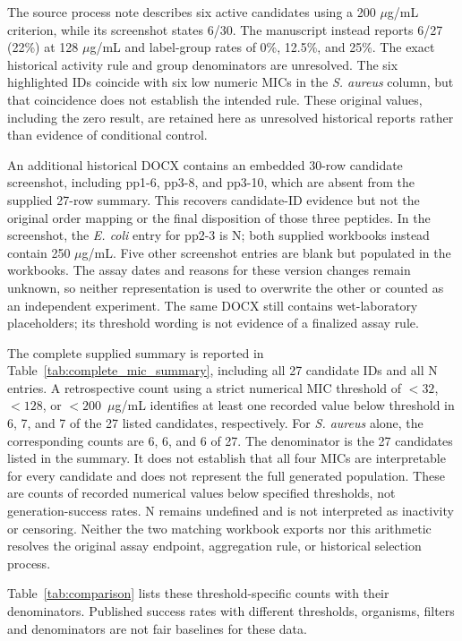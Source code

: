 \documentclass[journal]{IEEEtran}
\begin{document}
The source process note describes six active candidates using a 200 $\mu$g/mL criterion, while its screenshot states 6/30. The manuscript instead reports 6/27 (22\%) at 128 $\mu$g/mL and label-group rates of 0\%, 12.5\%, and 25\%. The exact historical activity rule and group denominators are unresolved. The six highlighted IDs coincide with six low numeric MICs in the \textit{S. aureus} column, but that coincidence does not establish the intended rule. These original values, including the zero result, are retained here as unresolved historical reports rather than evidence of conditional control.

An additional historical DOCX contains an embedded 30-row candidate screenshot, including pp1-6, pp3-8, and pp3-10, which are absent from the supplied 27-row summary. This recovers candidate-ID evidence but not the original order mapping or the final disposition of those three peptides. In the screenshot, the \textit{E. coli} entry for pp2-3 is N; both supplied workbooks instead contain 250 $\mu$g/mL. Five other screenshot entries are blank but populated in the workbooks. The assay dates and reasons for these version changes remain unknown, so neither representation is used to overwrite the other or counted as an independent experiment. The same DOCX still contains wet-laboratory placeholders; its threshold wording is not evidence of a finalized assay rule.

The complete supplied summary is reported in Table~\ref{tab:complete_mic_summary}, including all 27 candidate IDs and all N entries. A retrospective count using a strict numerical MIC threshold of $<32$, $<128$, or $<200$~$\mu$g/mL identifies at least one recorded value below threshold in 6, 7, and 7 of the 27 listed candidates, respectively. For \textit{S. aureus} alone, the corresponding counts are 6, 6, and 6 of 27. The denominator is the 27 candidates listed in the summary. It does not establish that all four MICs are interpretable for every candidate and does not represent the full generated population. These are counts of recorded numerical values below specified thresholds, not generation-success rates. N remains undefined and is not interpreted as inactivity or censoring. Neither the two matching workbook exports nor this arithmetic resolves the original assay endpoint, aggregation rule, or historical selection process.

Table~\ref{tab:comparison} lists these threshold-specific counts with their denominators. Published success rates with different thresholds, organisms, filters and denominators are not fair baselines for these data.
\end{document}
